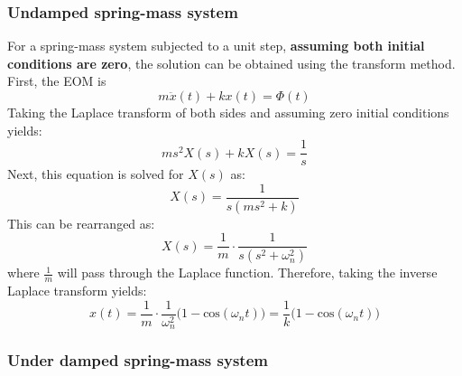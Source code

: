 \documentclass[12pt,letter]{article}
\numberwithin{ex}{section} %
\numberwithin{re}{section} %
\begin{document}
\subsubsection{Undamped spring-mass system}

For a spring-mass system subjected to a unit step, \textbf{assuming both initial conditions are zero}, the solution can be obtained using the transform method. First, the EOM is 
\begin{equation}
m\ddot{x}(t) + kx(t) = \Phi(t)
\end{equation}
Taking the Laplace transform of both sides and assuming zero initial conditions yields:
\begin{equation}
	ms^2X(s)+kX(s) =\frac{1}{s}
\end{equation}
Next, this equation is solved for $X(s)$ as:
\begin{equation}
	X(s) = \frac{1}{s(ms^2+k)}
\end{equation}
This can be rearranged as:
\begin{equation}
	X(s) = \frac{1}{m} \cdot \frac{1}{s(s^2+\omega_n^2)}
\end{equation}
where $\frac{1}{m}$ will pass through the Laplace function. Therefore, taking the inverse Laplace transform yields:
\begin{equation}
	x(t) = \frac{1}{m} \cdot \frac{1}{\omega_n^2}\big(1-\text{cos}(\omega_n t)\big) = \frac{1}{k}\big(1-\text{cos}(\omega_n t)\big)
\end{equation}
 
\subsubsection{Under damped spring-mass system}
\end{document}
